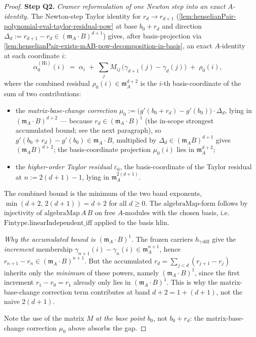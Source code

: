 \begin{proof}
\textbf{Step Q2.} \emph{Cramer reformulation of one Newton step
into an exact $A$-identity.}
The Newton-step Taylor identity for $r_d \to r_{d+1}$
(\cref{lem:henselianPair-polynomial-eval-taylor-residual-pow} at
base $b_0 + r_d$ and direction
$\Delta_d := r_{d+1} - r_d \in (\mathfrak m_A \cdot B)^{d+1}$)
gives, after basis-projection via
\cref{lem:henselianPair-exists-mAB-pow-decomposition-in-basis},
an exact $A$-identity at each coordinate $i$:
\[
\alpha^{(\mathrm{Hi})}_0(i)
\;=\;
\alpha_i \;+\; \sum_j M_{ij}\,\bigl(\gamma_{d+1}(j) -
\gamma_d(j)\bigr) \;+\; \rho_0(i),
\]
where the combined residual $\rho_0(i) \in \mathfrak m_A^{d+2}$
is the $i$-th basis-coordinate of the sum of two contributions:
\begin{itemize}
\item the \emph{matrix-base-change correction} $\mu_0 :=
\bigl(g'(b_0 + r_d) - g'(b_0)\bigr) \cdot \Delta_d$, lying in
$(\mathfrak m_A \cdot B)^{d+2}$ — because $r_d \in (\mathfrak
m_A \cdot B)^1$ (the in-scope strongest accumulated bound; see
the next paragraph), so $g'(b_0 + r_d) - g'(b_0) \in \mathfrak
m_A \cdot B$, multiplied by $\Delta_d \in (\mathfrak m_A
B)^{d+1}$ gives $(\mathfrak m_A B)^{d+2}$; the basis-coordinate
projection $\mu_0(i)$ lies in $\mathfrak m_A^{d+2}$;
\item the \emph{higher-order Taylor residual} $\varepsilon_0$,
the basis-coordinate of the Taylor residual at $n := 2(d+1) - 1$,
lying in $\mathfrak m_A^{2(d+1)}$.
\end{itemize}
The combined bound is the minimum of the two band exponents,
$\min(d+2,\, 2(d+1)) = d+2$ for all $d \ge 0$. The
$\mathrm{algebraMap}$-form follows by injectivity of
$\mathrm{algebraMap}\,A\,B$ on free $A$-modules with the chosen
basis, i.e.\ $\mathrm{Fintype.linearIndependent\_iff}$ applied to
the basis $\mathrm{hlin}$.

\emph{Why the accumulated bound is $(\mathfrak m_A \cdot B)^1$.}
The frozen carriers $h_{\gamma\,\mathrm{diff}}$ give the
\emph{increment} membership $\gamma_{n+1}(i) - \gamma_n(i) \in
\mathfrak m_A^{n+1}$, hence $r_{n+1} - r_n \in (\mathfrak m_A
\cdot B)^{n+1}$. But the accumulated $r_d = \sum_{j < d} (r_{j+1}
- r_j)$ inherits only the \emph{minimum} of these powers, namely
$(\mathfrak m_A \cdot B)^1$, since the first increment $r_1 - r_0
= r_1$ already only lies in $(\mathfrak m_A \cdot B)^1$. This is
why the matrix-base-change correction term contributes at band
$d + 2 = 1 + (d+1)$, not the naive $2(d+1)$.

Note the use of the matrix $M$ \emph{at the base point $b_0$},
not $b_0 + r_d$: the matrix-base-change correction $\mu_0$ above
absorbs the gap.


\end{proof}
